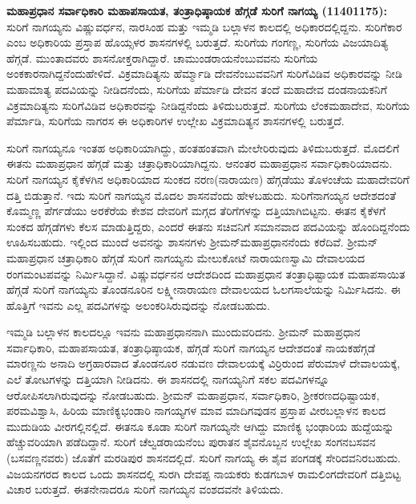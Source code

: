 \textbf{ಮಹಾಪ್ರಧಾನ ಸರ್ವಾಧಿಕಾರಿ ಮಹಾಪಸಾಯತ, ತಂತ್ರಾಧಿಷ್ಠಾಯಕ ಹೆಗ್ಗಡೆ ಸುರಿಗೆ ನಾಗಯ್ಯ (1140\general{\enginline{-}}1175):} ಸುರಿಗೆ ನಾಗಯ್ಯನು ವಿಷ್ಣುವರ್ಧನ, ನಾರಸಿಂಹ ಮತ್ತು ಇಮ್ಮಡಿ ಬಲ್ಲಾಳನ ಕಾಲದಲ್ಲಿ ಅಧಿಕಾರದಲ್ಲಿದ್ದನು. ಸುರಿಗೆಕಾರ ಎಂಬ ಅಧಿಕಾರಿಯ ಪ್ರಸ್ತಾಪ ಹೊಯ್ಸಳರ ಶಾಸನಗಳಲ್ಲಿ ಬರುತ್ತದೆ. ಸುರಿಗೆಯ ಗಂಗಣ್ಣ, ಸುರಿಗೆಯ ವಿಜಯಾದಿತ್ಯ ಹೆಗ್ಗಡೆ. ಮುಂತಾದವರು ಶಾಸನೋಕ್ತರಾಗಿದ್ದಾರೆ. ಚಾಮುಂಡರಾಯನೆಂಬುವವನು ಸುರಿಗೆಯ ಅಂಕಕಾರನಾಗಿದ್ದನೆಂದು\break ಹೇಳಿದೆ. ವಿಕ್ರಮಾದಿತ್ಯನು ಹೆರ್ಮ್ಮಾಡಿ ದೇವನೆಂಬುವವನಿಗೆ ಸುರಿಗೆವಿಡಿವ ಅಧಿಕಾರವನ್ನು ನೀಡಿ ಮಹಾಮಾತ್ಯ ಪದವಿಯನ್ನು ನೀಡಿದನೆಂದು, ಸುರಿಗೆಯ ಪೆರ್ಮಾಡಿ ದೇವನ ತಂದೆ ಮಹಾದೇವ ದಂಡನಾಯಕನಿಗೆ ವಿಕ್ರಮಾದಿತ್ಯನು ಸುರಿಗೆವಿಡಿವ ಅಧಿಕಾರವನ್ನು ನೀಡಿದ್ದನೆಂದು ತಿಳಿದುಬರುತ್ತದೆ. ಸುರಿಗೆಯ ಲೆಂಕಮಹಾದೇವ, ಸುರಿಗೆಯ ಪೆರ್ಮಾಡಿ, ಸುರಿಗೆಯ ನಾಗರಸ ಈ ಅಧಿಕಾರಿಗಳ ಉಲ್ಲೇಖ ವಿಕ್ರಮಾದಿತ್ಯನ ಶಾಸನಗಳಲ್ಲಿ ಬರುತ್ತದೆ.

ಸುರಿಗೆ ನಾಗಯ್ಯನೂ ಇಂತಹ ಅಧಿಕಾರಿಯಾಗಿದ್ದು, ಹಂತಹಂತವಾಗಿ ಮೇಲೇರಿರುವುದು ತಿಳಿದುಬರುತ್ತದೆ. ಮೊದಲಿಗೆ ಈತನು ಮಹಾಪ್ರಧಾನ ಹೆಗ್ಗಡೆ ಮತ್ತು ಚತ್ರಾಧಿಕಾರಿಯಾಗಿದ್ದನು. ಆನಂತರ ಮಹಾಪ್ರಧಾನ ಸರ್ವಾಧಿಕಾರಿಯಾದನು. ಸುರಿಗೆ ನಾಗಯ್ಯನ ಕೈಕೆಳಗಿನ ಅಧಿಕಾರಿಯಾದ ಸುಂಕದ ನರಣ(ನಾರಾಯಣ) ಹೆಗ್ಗಡೆಯು ತೊಳಂಚೆಯ ಮಹಾದೇವರಿಗೆ ದತ್ತಿ ಬಿಡುತ್ತಾನೆ. ಇದು ಸುರಿಗೆ ನಾಗಯ್ಯನ ಮೊದಲ ಶಾಸನವೆಂದು ಹೇಳಬಹುದು. ಸುರಿಗೆನಾಗಯ್ಯನ ಆದೇಶದಂತೆ ಕೊಮ್ಮಣ್ಣ ಪೆರ್ಗಡೆಯು ಅರಕೆರೆಯ ಕೇಶವ ದೇವರಿಗೆ ಮಗ್ಗದ ತೆರಿಗೆಗಳನ್ನು ದತ್ತಿಯಾಗಿಬಿಟ್ಟನು. ಈತನ ಕೈಕೆಳಗೆ ಸುಂಕದ ಹೆಗ್ಗಡೆಗಳು ಕೆಲಸ ಮಾಡುತ್ತಿದ್ದರು, ಎಂದರೆ ಈತನು ಸಚಿವನಿಗೆ ಸಮಾನವಾದ ಪದವಿಯನ್ನು ಹೊಂದಿದ್ದನೆಂದು ಊಹಿಸಬಹುದು. ಇಲ್ಲಿಂದ ಮುಂದೆ ಅವನನ್ನು ಶಾಸನಗಳು ಶ‍್ರೀಮನ್​ಮಹಾಪ್ರಧಾನನೆಂದು ಕರೆದಿವೆ. ಶ‍್ರೀಮನ್​ಮಹಾಪ್ರಧಾನ ಚತ್ರಾಧಿಕಾರಿ ಹೆಗ್ಗಡೆ ಸುರಿಗೆ ನಾಗಯ್ಯನು ಮೇಲುಕೋಟೆ ನಾರಾಯಣಸ್ವಾಮಿ ದೇವಾಲಯದ ರಂಗಮಂಟಪವನ್ನು ನಿರ್ಮಿಸಿದ್ದಾನೆ. ವಿಷ್ಣುವರ್ಧನನ ಆದೇಶದಿಂದ ಮಹಾಪ್ರಧಾನ ತಂತ್ರಾಧಿಷ್ಟಾಯಕ ಮಹಾಪಸಾಯಿತ ಹೆಗ್ಗಡೆ ಸುರಿಗೆ ನಾಗಯ್ಯನು ತೊಂಡನೂರಿನ ಲಕ್ಷ್ಮೀನಾರಾಯಣ ದೇವಾಲಯದ ಓಲಗಸಾಲೆಯನ್ನು ನಿರ್ಮಿಸಿದನು. ಈ ಹೊತ್ತಿಗೆ ಇವನು ಎಲ್ಲ ಪದವಿಗಳನ್ನು ಅಲಂಕರಿಸಿರುವುದನ್ನು ನೋಡಬಹುದು.

ಇಮ್ಮಡಿ ಬಲ್ಲಾಳನ ಕಾಲದಲ್ಲೂ ಇವನು ಮಹಾಪ್ರಧಾನನಾಗಿ ಮುಂದುವರಿದನು. ಶ‍್ರೀಮನ್​ ಮಹಾಪ್ರಧಾನ ಸರ್ವಾಧಿಕಾರಿ, ಮಹಾಪಸಾಯತ, ತಂತ್ರಾಧಿಷ್ಠಾಯಕ, ಹೆಗ್ಗಡೆ ಸುರಿಗೆ ನಾಗಯ್ಯನ ಆದೇಶದಂತೆ ನಾಯಕಹೆಗ್ಗಡೆ ಮಾರಣ್ಣನು ಅನಾದಿ ಅಗ್ರಹಾರವಾದ ತೊಂಡನೂರ ನಡುವಣ ದೇವಾಲಯಕ್ಕೆ ವಿರ್ರಿರುಂದ ಪೆರುಮಾಳೆ ದೇವಾಲಯಕ್ಕೆ, ಎಲೆ ತೋಟಗಳನ್ನು ದತ್ತಿಯಾಗಿ ನೀಡಿದನು. ಈ ಶಾಸನದಲ್ಲಿ ನಾಗಯ್ಯನಿಗೆ ಸಕಲ ಪದವಿಗಳನ್ನೂ ಆರೋಪಿಸಲಾಗಿರುವುದನ್ನು ನೋಡಬಹುದು. ಶ‍್ರೀಮನ್​ ಮಹಾಪ್ರಧಾನ, ಸರ್ವಾಧಿಕಾರಿ, ಶ‍್ರೀಕರಣದಧಿಷ್ಟಾಯಕ, ಪರಮವಿಶ್ವಾಸಿ, ಹಿರಿಯ ಮಾಣಿಕ್ಯಭಂಡಾರಿ ನಾಗಯ್ಯಗಳ ಮಾವ ಮಾದಿಗವುಡನ ಪ್ರಸ್ತಾಪ ವೀರಬಲ್ಲಾಳನ ಕಾಲದ ಮುದುಡಿಯ ವೀರಗಲ್ಲಿನಲ್ಲಿದೆ. ಈತನೂ ಕೂಡಾ ಸುರಿಗೆ ನಾಗಯ್ಯನೇ ಆಗಿದ್ದು ಮಾಣಿಕ್ಯ ಭಂಢಾರಿಯ ಹುದ್ದೆಯನ್ನು ಹೆಚ್ಚುವರಿಯಾಗಿ ಪಡೆದಿದ್ದಾನೆ. ಸುರಿಗೆ ಚೆಲ್ವಡರಾಯನೆಂಬ ಪುರಾತನ ಶೈವನೊಬ್ಬನ ಉಲ್ಲೇಖ ಸಂಗನಬಸವನ (ಬಸವಣ್ಣನವರು) ಜೊತೆಗೆ ಮರಡಿಪುರ ಶಾಸನದಲ್ಲಿದೆ. ಸುರಿಗೆ ನಾಗಯ್ಯ ಈ ಶೈವ ಪಂಗಡಕ್ಕೆ ಸೇರಿದವನಿರಬಹುದು. ವಿಜಯನಗರದ ಕಾಲದ ಒಂದು ಶಾಸನದಲ್ಲಿ ಸುರಗಿ ದೇವಪ್ಪ ನಾಯಕರು ಕುಡಗಬಾಳ ರಾಮಲಿಂಗದೇವರಿಗೆ ದತ್ತಿಬಿಟ್ಟ ವಿಚಾರ ಬರುತ್ತದೆ. ಈತನೇನಾದರೂ ಸುರಿಗೆ ನಾಗಯ್ಯನ ವಂಶದವನೇ ತಿಳಿಯದು.


